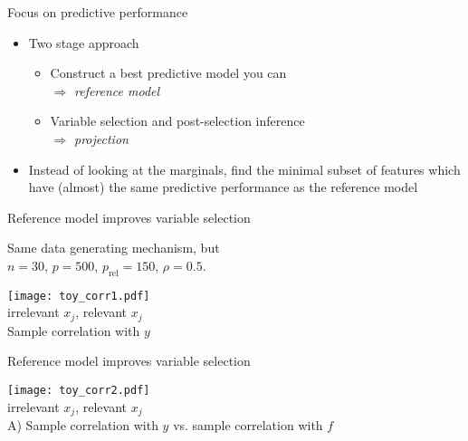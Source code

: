 \documentclass[english,t]{beamer}
\begin{document}
\begin{frame}{}

  {\Large\color{navyblue} Focus on predictive performance}

  \begin{itemize}
  \item Two stage approach
    \begin{itemize}
    \item Construct a best predictive model you can\\ $\Rightarrow$ {\it reference model}
    \item Variable selection and post-selection inference\\ $\Rightarrow$ {\it projection}
    \end{itemize}
  \item<2-> Instead of looking at the marginals, find the minimal
    subset of features which have (almost) the same predictive
    performance as the reference model
  \end{itemize}
  
\end{frame}

\begin{frame}{}

  {\Large\color{navyblue} Reference model improves variable selection}

  Same data generating mechanism, but\\ $n=30$, $p=500$, $p_\text{rel}=150$, $\rho=0.5$.

  \texttt{[image: toy\_corr1.pdf]}\\
  \vspace{-0.2cm}
  \hspace{0.5cm} {\color{set12} irrelevant $x_j$}, {\color{set11} relevant $x_j$}\\
  \vspace{0.2cm}
  \hspace{0.5cm} Sample correlation with $y$\\
  
\end{frame}

\begin{frame}{}

  {\Large\color{navyblue} Reference model improves variable selection}

  \texttt{[image: toy\_corr2.pdf]}
  \\
  \vspace{-0.2cm}
  \hspace{0.5cm} {\color{set12} irrelevant $x_j$}, {\color{set11} relevant $x_j$}\\
  \vspace{0.2cm}
  A) Sample correlation with $y$ vs. sample correlation with $f$\\
  
\end{frame}
\end{document}
